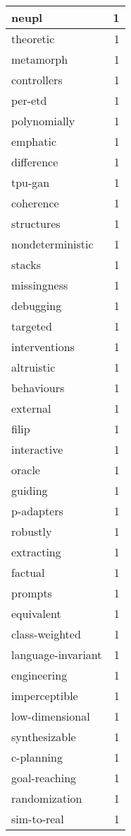 \begin{table}[h]
\begin{tabular}{|l|r|}
neupl & 1 \\
\hline
theoretic & 1 \\
\hline
metamorph & 1 \\
\hline
controllers & 1 \\
\hline
per-etd & 1 \\
\hline
polynomially & 1 \\
\hline
emphatic & 1 \\
\hline
difference & 1 \\
\hline
tpu-gan & 1 \\
\hline
coherence & 1 \\
\hline
structures & 1 \\
\hline
nondeterministic & 1 \\
\hline
stacks & 1 \\
\hline
missingness & 1 \\
\hline
debugging & 1 \\
\hline
targeted & 1 \\
\hline
interventions & 1 \\
\hline
altruistic & 1 \\
\hline
behaviours & 1 \\
\hline
external & 1 \\
\hline
filip & 1 \\
\hline
interactive & 1 \\
\hline
oracle & 1 \\
\hline
guiding & 1 \\
\hline
p-adapters & 1 \\
\hline
robustly & 1 \\
\hline
extracting & 1 \\
\hline
factual & 1 \\
\hline
prompts & 1 \\
\hline
equivalent & 1 \\
\hline
class-weighted & 1 \\
\hline
language-invariant & 1 \\
\hline
engineering & 1 \\
\hline
imperceptible & 1 \\
\hline
low-dimensional & 1 \\
\hline
synthesizable & 1 \\
\hline
c-planning & 1 \\
\hline
goal-reaching & 1 \\
\hline
randomization & 1 \\
\hline
sim-to-real & 1 \\
\hline

\end{tabular}
\end{table}
